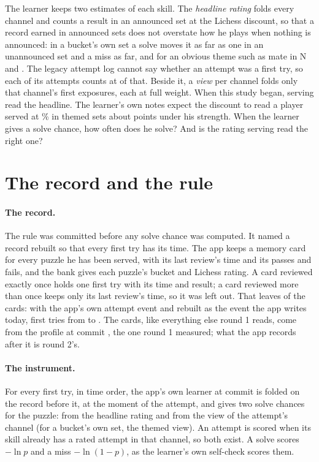 \documentclass[11pt]{article}
\begin{document}
The learner keeps two estimates of each skill. The \emph{headline rating} folds every channel and
counts a result in an announced set at the Lichess discount, so that a record earned in announced
sets does not overstate how he plays when nothing is announced: in a bucket's own set a solve moves
it \ThemedWin{} as far as one in an unannounced set and a miss \ThemedLoss{} as far, and for an
obvious theme such as mate in N \ObviousWin{} and \ObviousLoss. The legacy attempt log cannot say
whether an attempt was a first try, so each of its attempts counts at \UnknownFirst{} of that. Beside it, a
\emph{view} per channel folds only that channel's first exposures, each at full weight. When this
study began, serving read the headline. The learner's own notes expect the discount to read a
player served at \TargetCore\% in themed sets about \NotesPoints{} points under his strength. When
the learner gives a solve chance, how often does he solve? And is the rating serving read the
right one?

\section{The record and the rule}

\paragraph{The record.} The rule was committed before any solve chance was computed. It named a
record rebuilt so that every first try has its time. The app keeps a memory card for every puzzle
he has been served, with its last review's time and its passes and fails, and the bank gives each
puzzle's bucket and Lichess rating. A card reviewed exactly once holds one first try with its time
and result; a card reviewed more than once keeps only its last review's time, so it was left out.
That leaves \Once{} of the \Cards{} cards: \FromEvents{} with the app's own attempt event and
\Rebuilt{} rebuilt as the event the app writes today, \RFirstTries{} first tries from \RFrom{} to
\RTo. The cards, like everything else round 1 reads, come from the profile at commit
\ProfileCommit, the one round 1 measured; what the app records after it is round 2's.

\paragraph{The instrument.} For every first try, in time order, the app's own learner at commit
\AppCommit{} is folded on the record before it, at the moment of the attempt, and gives two solve
chances for the puzzle: from the headline rating and from the view of the attempt's channel (for a
bucket's own set, the themed view). An attempt is scored when its skill already has a rated attempt
in that channel, so both exist. A solve scores $-\ln p$ and a miss $-\ln(1-p)$, as the learner's
own self-check scores them.
\end{document}
